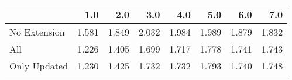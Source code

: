 \begin{tabular}{lrrrrrrr}
\toprule
{} &   1.0 &   2.0 &   3.0 &   4.0 &   5.0 &   6.0 &   7.0 \\
\midrule
No Extension & 1.581 & 1.849 & 2.032 & 1.984 & 1.989 & 1.879 & 1.832 \\
All          & 1.226 & 1.405 & 1.699 & 1.717 & 1.778 & 1.741 & 1.743 \\
Only Updated & 1.230 & 1.425 & 1.732 & 1.732 & 1.793 & 1.740 & 1.748 \\
\bottomrule
\end{tabular}
